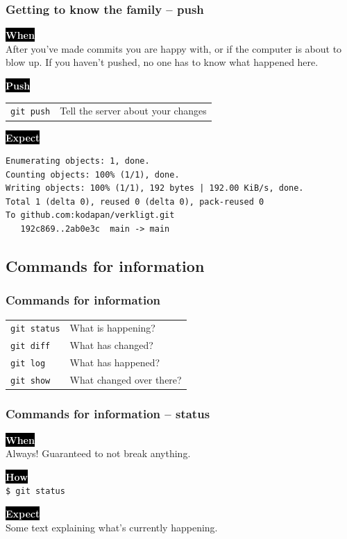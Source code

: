 \documentclass{beamer}
\newcommand{\keyword}[1]{\hspace{-1.0em}\colorbox{black}{\textcolor{white}{\textbf{#1}\vphantom{Ep}}}\vspace{0.2em}} %
\begin{document}
\begin{frame}[fragile]
  \frametitle{Getting to know the family -- push}
  \keyword{When}\\
    After you've made commits you are happy with, or if the computer
    is about to blow up. If you haven't pushed, no one has to know what
    happened here.\\
  \vspace{0.5em}

  \keyword{Push}\\
  \hspace{-1.0em}
  \begin{tabular}{ll}
    \texttt{git push} & Tell the server about your changes \\
  \end{tabular}
  \vspace{0.5em}

  \keyword{Expect}\\ [0.1em]
\begin{verbatim}
Enumerating objects: 1, done.
Counting objects: 100% (1/1), done.
Writing objects: 100% (1/1), 192 bytes | 192.00 KiB/s, done.
Total 1 (delta 0), reused 0 (delta 0), pack-reused 0
To github.com:kodapan/verkligt.git
   192c869..2ab0e3c  main -> main
\end{verbatim}
\end{frame}

\subsection{Commands for information}

\begin{frame}[fragile]
  \frametitle{Commands for information}

  \begin{tabular}{ll}
    \texttt{git status} & What is happening? \\
    \texttt{git diff} & What has changed? \\
    \texttt{git log} & What has happened? \\
    \texttt{git show} & What changed over there? \\
  \end{tabular}

\end{frame}

\begin{frame}
  \frametitle{Commands for information -- status}

  \keyword{When}\\
  Always! Guaranteed to not break anything.
  \vspace{0.5em}

  \keyword{How}\\
  \texttt{\$ git status}
  \vspace{0.5em}

  \keyword{Expect}\\
  Some text explaining what's currently happening.
\end{frame}
\end{document}
